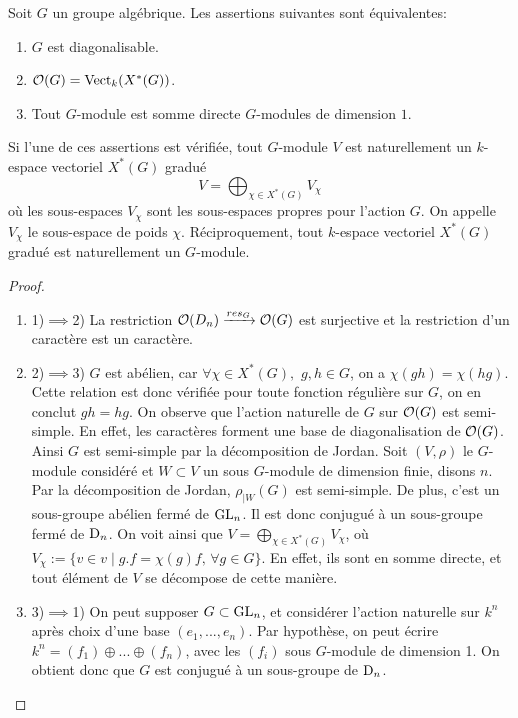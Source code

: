 \begin{prop}\label{GroupeDiagCarac}
Soit $G$ un groupe algébrique. Les assertions suivantes sont équivalentes:
\begin{enumerate}
\item $G$ est diagonalisable.
\item $\mathcal{O}(G)=\operatorname{Vect}_k(X^*(G))$.
\item Tout $G$-module est somme directe $G$-modules de dimension $1$.
\end{enumerate}
Si l'une de ces assertions est vérifiée, tout $G$-module $V$ est naturellement un $k$-espace vectoriel $X^*(G)$ gradué
$$V=\bigoplus_{\chi \in X^*(G)}V_{\chi}$$
où les sous-espaces $V_{\chi}$ sont les sous-espaces propres pour l'action $G$. On appelle $V_{\chi}$ le sous-espace de poids $\chi$. Réciproquement, tout $k$-espace vectoriel $X^*(G)$ gradué est naturellement un $G$-module.
\end{prop}
\begin{proof}
\begin{enumerate}
\item 1)$\implies$2) La restriction $\mathcal{O}(D_n)\xrightarrow{res_G} \mathcal{O}(G)$ est surjective et la restriction d'un caractère est un caractère.
\item 2)$\implies$3) $G$ est abélien, car $\forall \chi\in X^*(G),\,\,g,h\in G$, on a $\chi(gh)=\chi(hg)$. Cette relation est donc vérifiée pour toute fonction régulière sur $G$, on en conclut $gh=hg$. On observe que l'action naturelle de $G$ sur $\mathcal{O}(G)$ est semi-simple. En effet, les caractères forment une base de diagonalisation de $\mathcal{O}(G)$. Ainsi $G$ est semi-simple par la décomposition de Jordan. Soit $(V,\rho)$ le $G$-module considéré et $W\subset V$ un sous $G$-module de dimension finie, disons $n$. Par la décomposition de Jordan,  $\rho_{|W}(G)$ est semi-simple. De plus, c'est un sous-groupe abélien fermé de $\operatorname{GL}_n$. Il est donc conjugué à un sous-groupe fermé de $\operatorname{D}_n$. On voit ainsi que $V=\bigoplus_{\chi \in X^*(G)}V_\chi$, où $V_\chi:=\lbrace v\in v\mid g.f=\chi(g)f,\, \forall g\in G \rbrace$. En effet, ils sont en somme directe, et tout élément de $V$ se décompose de cette manière.
\item 3)$\implies$1) On peut supposer $G\subset \operatorname{GL}_n$, et considérer l'action naturelle sur $k^n$ après choix d'une base $(e_1,...,e_n)$. Par hypothèse, on peut écrire $k^n=(f_1)\oplus...\oplus (f_n)$, avec les $(f_i)$ sous $G$-module de dimension 1. On obtient donc que $G$ est conjugué à un sous-groupe de $\operatorname{D}_n$.
\end{enumerate}
\end{proof}


